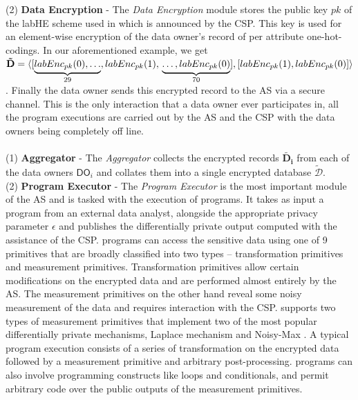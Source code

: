 (2)\textbf{ Data Encryption} - The \textit{Data Encryption} module stores the public key $pk$ of the labHE scheme used in \system which is announced by the CSP. This key is used for an element-wise encryption of the data owner's  record of per attribute one-hot-codings. In our aforementioned example, we get $\mathbf{\tilde{D}}=\langle[\underbrace{labEnc_{pk}(0),\ldots}_{29},labEnc_{pk}(1),\\\underbrace{\ldots,labEnc_{pk}(0)}_{70}],
[labEnc_{pk}(1),labEnc_{pk}(0)]\rangle$. Finally the data owner sends this encrypted record to the \textsf{AS} via a secure channel. This is the only interaction that a data owner ever participates in, all the program executions are carried out by the \textsf{AS} and the \textsf{CSP} with the data owners being completely off line.\\
\\
(1)\textbf{  Aggregator} - The \textit{Aggregator} collects the encrypted records $\mathbf{\tilde{D_i}}$ from each of the data owners $\textsf{DO}_i$ and collates them into a single encrypted database $\boldsymbol{\tilde{\mathcal{D}}}$. %
\\(2)\textbf{ Program Executor }- The \textit{Program Executor} is the most important module of the \textsf{AS} and is tasked with the execution of \system programs. It takes as input a \system program from an external data analyst, alongside the appropriate privacy parameter $\epsilon$ and publishes the differentially private output computed with the assistance of the \textsf{CSP}. \system programs can access the sensitive data using one of 9 primitives that are  broadly classified into two types -- transformation primitives and measurement primitives. Transformation primitives allow certain modifications on the encrypted data and are performed almost entirely by the \textsf{AS}. The measurement primitives on the other hand reveal some noisy measurement of the data and requires interaction with the \textsf{CSP}. \system supports two types of measurement primitives that implement two of the most popular differentially private mechanisms, Laplace mechanism \cite{Dork} and Noisy-Max \cite{Dork}. A typical \system program execution consists of  a series of transformation on the encrypted data followed by a measurement primitive and arbitrary post-processing. \system programs can also involve programming constructs like loops and conditionals, and permit arbitrary code over the public outputs of the measurement primitives. 

